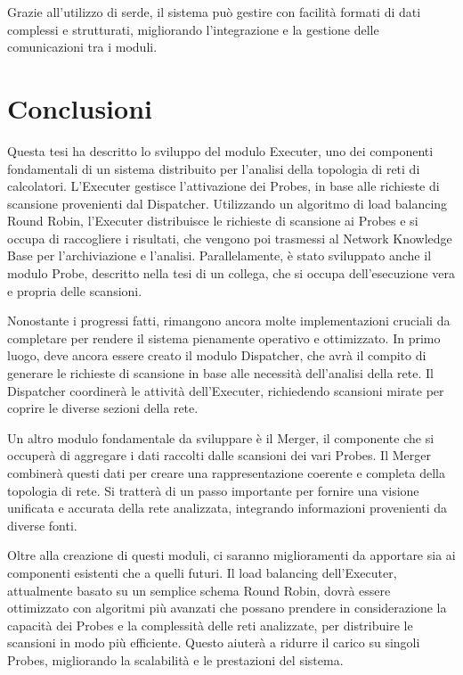 \documentclass[target=bach,aauheader=,style=]{thud}
\begin{document}
Grazie all'utilizzo di serde, il sistema può gestire con facilità formati di dati complessi e strutturati, migliorando l'integrazione e la gestione delle comunicazioni tra i moduli.



\chapter{Conclusioni}
Questa tesi ha descritto lo sviluppo del modulo Executer, uno dei componenti fondamentali di un sistema distribuito per l'analisi della topologia di reti di calcolatori. L'Executer gestisce l'attivazione dei Probes, in base alle richieste di scansione provenienti dal Dispatcher. Utilizzando un algoritmo di load balancing Round Robin, l'Executer distribuisce le richieste di scansione ai Probes e si occupa di raccogliere i risultati, che vengono poi trasmessi al Network Knowledge Base per l'archiviazione e l'analisi. Parallelamente, è stato sviluppato anche il modulo Probe, descritto nella tesi di un collega, che si occupa dell'esecuzione vera e propria delle scansioni.


Nonostante i progressi fatti, rimangono ancora molte implementazioni cruciali da completare per rendere il sistema pienamente operativo e ottimizzato. In primo luogo, deve ancora essere creato il modulo Dispatcher, che avrà il compito di generare le richieste di scansione in base alle necessità dell’analisi della rete. Il Dispatcher coordinerà le attività dell’Executer, richiedendo scansioni mirate per coprire le diverse sezioni della rete.


Un altro modulo fondamentale da sviluppare è il Merger, il componente che si occuperà di aggregare i dati raccolti dalle scansioni dei vari Probes. Il Merger combinerà questi dati per creare una rappresentazione coerente e completa della topologia di rete. Si tratterà di un passo importante per fornire una visione unificata e accurata della rete analizzata, integrando informazioni provenienti da diverse fonti.


Oltre alla creazione di questi moduli, ci saranno miglioramenti da apportare sia ai componenti esistenti che a quelli futuri. Il load balancing dell'Executer, attualmente basato su un semplice schema Round Robin, dovrà essere ottimizzato con algoritmi più avanzati che possano prendere in considerazione la capacità dei Probes e la complessità delle reti analizzate, per distribuire le scansioni in modo più efficiente. Questo aiuterà a ridurre il carico su singoli Probes, migliorando la scalabilità e le prestazioni del sistema.
\end{document}
